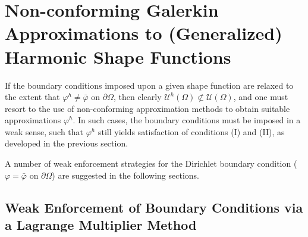 \section{Non-conforming Galerkin Approximations to (Generalized) Harmonic Shape Functions} \label{sec:nonconforming}

	If the boundary conditions imposed upon a given shape function are relaxed to the extent that $\varphi^h \neq \bar{\varphi}$ on $\partial \Omega$, then clearly $\mathcal{U}^h (\Omega) \not\subset \mathcal{U} (\Omega)$, and one must resort to the use of non-conforming approximation methods to obtain suitable approximations $\varphi^h$. In such cases, the boundary conditions must be imposed in a weak sense, such that $\varphi^h$ still yields satisfaction of conditions (I) and (II), as developed in the previous section.
	
	A number of weak enforcement strategies for the Dirichlet boundary condition ($\varphi = \bar{\varphi}$ on $\partial \Omega$) are suggested in the following sections.
	
	\subsection*{Weak Enforcement of Boundary Conditions via a Lagrange Multiplier Method}
	
